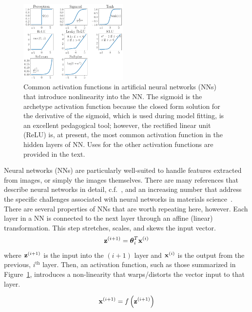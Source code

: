 \begin{figure}
	\includegraphics[width=0.48\textwidth]{Images/ActivationFunctions}
	\caption{Common activation functions in artificial neural networks (NNs) that introduce nonlinearity into the NN. The sigmoid is the archetype activation function because the closed form solution for the derivative of the sigmoid, which is used during model fitting, is an excellent pedagogical tool; however, the rectified linear unit (ReLU) is, at present, the most common activation function in the hidden layers of NN. Uses for the other activation functions are provided in the text.}
	\label{fig:activation functions}
\end{figure}

Neural networks (NNs) are particularly well-suited to handle features extracted from images, or simply the images themselves. There are many references that describe neural networks in detail, c.f.~\cite{Hastie2009}, and an increasing number that address the specific challenges associated with neural networks in materials science~\cite{Bhadeshia2009}. There are several properties of NNs that are worth repeating here, however. Each layer in a NN is connected to the next layer through an affine (linear) transformation. This step stretches, scales, and skews the input vector.
\begin{equation}
	{\bold z}^{(i+1)} = \boldsymbol \theta_i^T {\bold x}^{(i)}
\end{equation}
where ${\bold z}^{(i+1)}$ is the input into the $(i+1)$ layer and ${\bold x}^{(i)}$ is the output from the previous, $i^\textrm{th}$ layer. Then, an activation function, such as those summarized in Figure~\ref{fig:activation functions}, introduces a non-linearity that warps/distorts the vector input to that layer. 

\begin{equation}
	{\bold x}^{(i+1)} = f \left( {\bold z}^{(i+1)} \right)
\end{equation}

